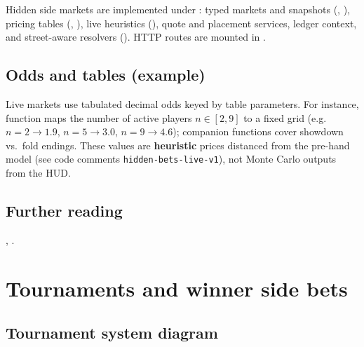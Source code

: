 \documentclass[11pt,a4paper]{article}
\begin{document}
Hidden side markets are implemented under : typed markets and snapshots (, ), pricing tables (, ), live heuristics (), quote and placement services, ledger context, and street-aware resolvers (). HTTP routes are mounted in .

\subsection{Odds and tables (example)}

Live markets use tabulated decimal odds keyed by table parameters. For instance, function \linebreak maps the number of active players $n\in[2,9]$ to a fixed grid (e.g.\ $n=2 \rightarrow 1.9$, $n=5 \rightarrow 3.0$, $n=9 \rightarrow 4.6$); companion functions cover showdown vs.\ fold endings. These values are \textbf{heuristic} prices distanced from the pre-hand model (see code comments \texttt{hidden-bets-live-v1}), not Monte Carlo outputs from the HUD.

\subsection{Further reading}

, .

\section{Tournaments and winner side bets}
\label{app:tournament}

\subsection{Tournament system diagram}
\end{document}
